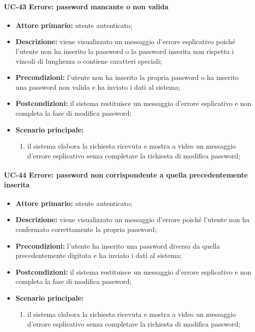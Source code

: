 \paragraph{UC-43 Errore: password mancante o non valida}


	\begin{itemize}
		\item \textbf{Attore primario:} utente autenticato;

		\item \textbf{Descrizione:} viene visualizzato un messaggio d'errore esplicativo poiché l'utente non ha inserito la password o la password inserita non rispetta i vincoli di lunghezza o contiene caratteri speciali;

		\item \textbf{Precondizioni:} l'utente non ha inserito la propria password o ha inserito una password non valida e ha inviato i dati al sistema;

		\item \textbf{Postcondizioni:} il sistema restituisce un messaggio d'errore esplicativo e non completa la fase di modifica password;

		\item \textbf{Scenario principale:}
	  		\begin{enumerate}
		  		\item il sistema elabora la richiesta ricevuta e mostra a video un messaggio d'errore esplicativo senza completare la richiesta di modifica password; 
	  		\end{enumerate}
	\end{itemize}


\paragraph{UC-44 Errore: password non corrispondente a quella precedentemente inserita}

	\begin{itemize}
		\item \textbf{Attore primario:} utente autenticato;

		\item \textbf{Descrizione:}  viene visualizzato un messaggio d'errore poiché l'utente non ha confermato correttamente la propria password;

		\item \textbf{Precondizioni:} l'utente ha inserito una password diversa da quella precedentemente digitata e ha inviato i dati al sistema;

		\item \textbf{Postcondizioni:} il sistema restituisce un messaggio d'errore esplicativo e non completa la fase di modifica password;

		\item \textbf{Scenario principale:}
	  		\begin{enumerate}
		  		\item il sistema elabora la richiesta ricevuta e mostra a video un messaggio d'errore esplicativo senza completare la richiesta di modifica password; 
	  		\end{enumerate}
	\end{itemize}

